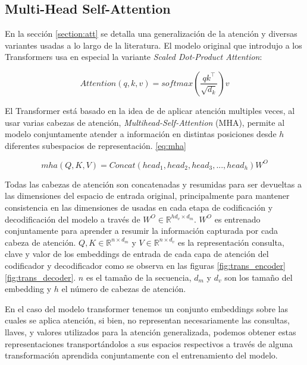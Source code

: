\subsection{Multi-Head Self-Attention} \label{section-mha}

En la sección \ref{section:att} se detalla una generalización de la atención y diversas variantes usadas
a lo largo de la literatura. El modelo original que introdujo a los Transformers usa en especial la variante
\textit{Scaled Dot-Product Attention}\cite{Vaswani}:

\begin{equation}
    Attention(q, k, v) = softmax(\frac{q k^\top}{\sqrt{d_k}}) v
    \label{eq:trans_att_gen}
\end{equation}

El Transformer está basado en la idea de de aplicar atención multiples veces, al usar varias cabezas
de atención, \textit{Multihead-Self-Attention} (MHA), permite  al modelo conjuntamente atender a información
en distintas posiciones desde $h$ diferentes subespacios de representación. \ref{eq:mha}

\begin{equation}
    mha(Q, K, V) = Concat(head_1,head_2,head_3,..., head_h)W^O
    \label{eq:mha}
\end{equation}

Todas las cabezas de atención son concatenadas y resumidas para ser devueltas a las dimensiones del
espacio de entrada original, principalmente para mantener consistencia en las dimensiones de usadas
en cada etapa de codificación y decodificación del modelo a través de $W^O \in \mathbb{R}^{hd_v \times d_m}$.
$W^O$ es entrenado conjuntamente para aprender a resumir la información capturada por cada cabeza de
atención. $Q, K \in \mathbb{R}^{n \times d_{m}}$ y $V \in \mathbb{R}^{n \times d_{v}}$ es la representación
consulta, clave y valor de los embeddings de entrada de cada capa de atención del codificador y
decodificador como se observa en las figuras \ref{fig:trans_encoder} \ref{fig:trans_decoder}.
$n$ es el tamaño de la secuencia, $d_m$ y $d_v$ son los tamaño del embedding y $h$ el número de
cabezas de atención.

En el caso del modelo transformer tenemos un conjunto embeddings sobre las cuales se aplica atención,
si bien, no representan necesariamente las consultas, llaves, y valores utilizados para la atención
generalizada, podemos obtener estas representaciones transportándolos a sus espacios respectivos a través de alguna
transformación aprendida conjuntamente con el entrenamiento del modelo.

